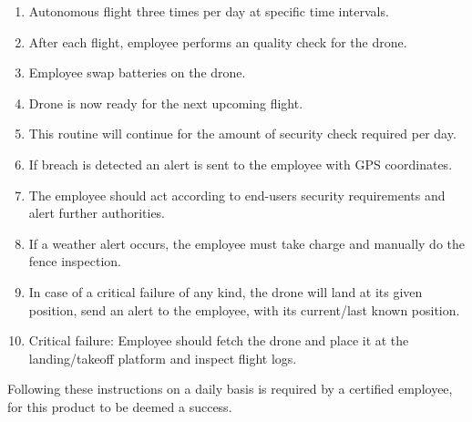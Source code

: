\documentclass[../Head/Main.tex]{subfiles}
\begin{document}
\begin{enumerate}
    \item Autonomous flight three times per day at specific time intervals. \vspace{-5pt}
    \item After each flight, employee performs an quality check for the drone. \vspace{-5pt}
    \item Employee swap batteries on the drone. \vspace{-5pt}
    \item Drone is now ready for the next upcoming flight. \vspace{-5pt}
    \item This routine will continue for the amount of security check required per day. \vspace{-5pt} 
    \item If breach is detected an alert is sent to the employee with GPS coordinates. \vspace{-5pt}
    \item The employee should act according to end-users security requirements and alert further authorities. \vspace{-5pt}
    \item If a weather alert occurs, the employee must take charge and manually do the fence inspection. \vspace{-5pt}
    \item In case of a critical failure of any kind, the drone will land at its given position, send an alert to the employee, with its current/last known position. \vspace{-5pt}
    \item Critical failure: Employee should fetch the drone and place it at the landing/takeoff platform and inspect flight logs. 
\end{enumerate}

Following these instructions on a daily basis is required by a certified employee, for this product to be deemed a success. 
\end{document}
